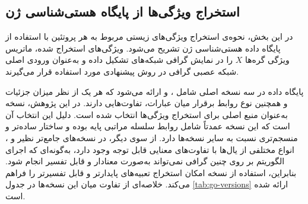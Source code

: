  \subsection{استخراج ویژگی‌ها از پایگاه هستی‌شناسی ژن}
 
 در این بخش، نحوه‌ی استخراج ویژگی‌های زیستی مربوط به هر پروتئین با استفاده از پایگاه داده هستی‌شناسی ژن تشریح می‌شود. ویژگی‌های استخراج‌ شده، ماتریس ویژگی گره‌ها $X$ را در نمایش گرافی شبکه‌های  تشکیل داده و به‌عنوان ورودی اصلی شبکه عصبی گرافی در روش پیشنهادی مورد استفاده قرار می‌گیرند.
 
 پایگاه داده  در سه نسخه اصلی شامل ،  و  ارائه می‌شود که هر یک از نظر میزان جزئیات و همچنین نوع روابط برقرار میان عبارات، تفاوت‌هایی دارند. در این پژوهش، نسخه  به‌عنوان منبع اصلی برای استخراج ویژگی‌ها انتخاب شده است. دلیل این انتخاب آن است که این نسخه عمدتاً شامل روابط سلسله‌ مراتبی پایه بوده و ساختار ساده‌تر و منسجم‌تری نسبت به سایر نسخه‌ها دارد. 
 از سوی دیگر، در نسخه‌های جامع‌تر نظیر  و ، انواع مختلفی از یال‌ها با تفاوت‌های معنایی قابل توجه وجود دارد، به‌گونه‌ای که اجرای الگوریتم  بر روی چنین گرافی نمی‌تواند به‌صورت معنادار و قابل تفسیر انجام شود. بنابراین، استفاده از نسخه  امکان استخراج تعبیه‌های پایدارتر و قابل تفسیرتر را فراهم می‌کند. 
 خلاصه‌ای از تفاوت میان این نسخه‌ها در جدول \ref{tab:go-versions} ارائه شده است.

